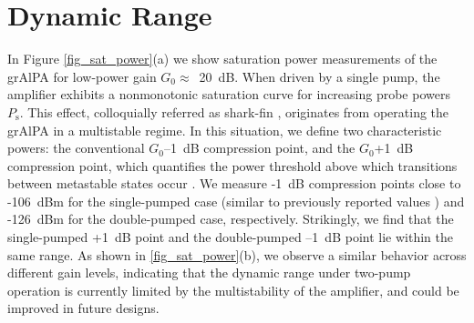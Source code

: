 \documentclass[%
reprint,
floatfix,
superscriptaddress,
amsmath,amssymb,
aps,
pra,
]{revtex4-2}
\begin{document}
\section{Dynamic Range}
\label{A_DynamicRange}

In Figure \ref{fig_sat_power}(a) we show saturation power measurements of the grAlPA for low-power gain $G\mathrm{_0} \approx$~20~dB. When driven by a single pump, the amplifier exhibits a nonmonotonic saturation curve for increasing probe powers $P\mathrm{_s}$. This effect, colloquially referred as shark-fin \cite{Sivak2019}, originates from operating the grAlPA in a multistable regime. In this situation, we define two characteristic powers: the conventional $G\mathrm{_0}$–1~dB compression point, and the $G\mathrm{_0}$+1~dB compression point, which quantifies the power threshold above which transitions between metastable states occur \cite{Sivak2019}. We measure -1~dB compression points close to -106~dBm for the single-pumped case (similar to previously reported values \cite{Zapata2024Dec}) and -126~dBm for the double-pumped case, respectively. Strikingly, we find that the single-pumped +1~dB point and the double-pumped –1~dB point lie within the same range. As shown in \cref{fig_sat_power}(b), we observe a similar behavior across different gain levels, indicating that the dynamic range under two-pump operation is currently limited by the multistability of the amplifier, and could be improved in future designs. 


%

\end{document}
